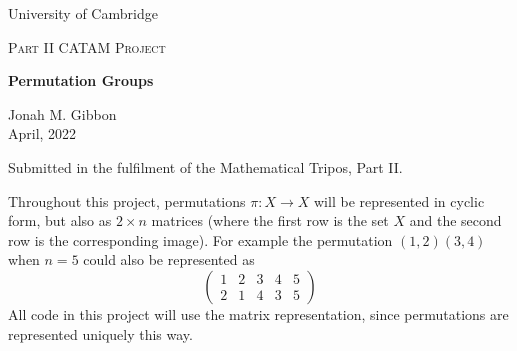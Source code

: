 \documentclass[10pt,a4paper,notitlepage]{article}
\begin{document}
\begin{titlepage}
	\centering
	\vspace*{5cm}
	{\large{University of Cambridge} \par}
	\vspace{1cm}
	{\Large \textsc{Part II CATAM Project}\par}
	\vspace{1.5cm}
	{\huge\bfseries Permutation Groups\par}
	\vspace{2cm}
	{\Large Jonah M. Gibbon\\ \vspace{0.6cm} April, 2022}
	\vfill
	


	{Submitted in the fulfilment of the Mathematical Tripos, Part II.}
\end{titlepage}
Throughout this project, permutations $\pi :X\rightarrow X$ will be represented in cyclic form, but also as $2\times n$ matrices (where the first row is the set $X$ and the second row is the corresponding image). For example the permutation $(1,2)(3,4)$ when $n=5$ could also be represented as
\begin{equation*}
\begin{pmatrix}
1&2&3&4&5\\
2&1&4&3&5
\end{pmatrix}
\end{equation*}
All code in this project will use the matrix representation, since permutations are represented uniquely this way.
\end{document}
